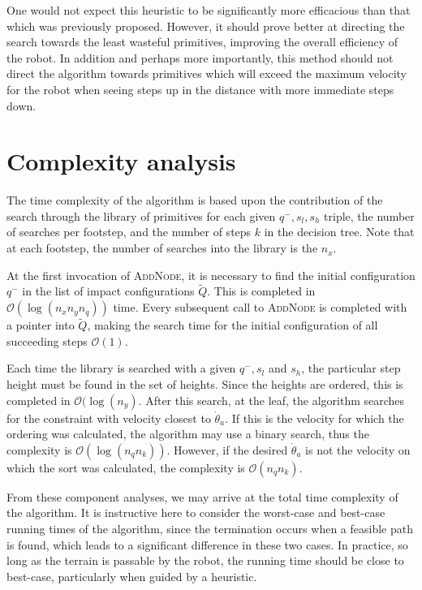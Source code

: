 One would not expect this heuristic to be significantly more efficacious than that which was previously proposed. However, it should prove better at directing the search towards the least wasteful primitives, improving the overall efficiency of the robot. In addition and perhaps more importantly, this method should not direct the algorithm towards primitives which will exceed the maximum velocity for the robot when seeing steps up in the distance with more immediate steps down.

\section{Complexity analysis}
The time complexity of the algorithm is based upon the contribution of the search through the library of primitives for each given $q^-,s_l,s_h$ triple, the number of searches per footstep, and the number of steps $k$ in the decision tree. Note that at each footstep, the number of searches into the library is the $n_x$.

At the first invocation of \textsc{AddNode}, it is necessary to find the initial configuration $q^-$ in the list of impact configurations $\tilde{Q}$. This is completed in $\mathcal{O}(\log(n_xn_yn_q))$ time. Every subsequent call to \textsc{AddNode} is completed with a pointer into $\tilde{Q}$, making the search time for the initial configuration of all succeeding steps $\mathcal{O}(1)$.

Each time the library is searched with a given $q^-,s_l$ and $s_h$, the particular step height must be found in the set of heights. Since the heights are ordered, this is completed in $\mathcal{O}(\log(n_y)$. After this search, at the leaf, the algorithm searches for the constraint with velocity closest to $\dot{\theta}_a$. If this is the velocity for which the ordering was calculated, the algorithm may use a binary search, thus the complexity is $\mathcal{O}(\log(n_qn_k))$. {\color{orange}However, if the desired $\dot{\theta}_a$ is not the velocity on which the sort was calculated, the complexity is $\mathcal{O}(n_qn_k)$.}

From these component analyses, we may arrive at the total time complexity of the algorithm. It is instructive here to consider the worst-case and best-case running times of the algorithm, since the termination occurs when a feasible path is found, which leads to a significant difference in these two cases. In practice, so long as the terrain is passable by the robot, the running time should be close to best-case, particularly when guided by a heuristic.

